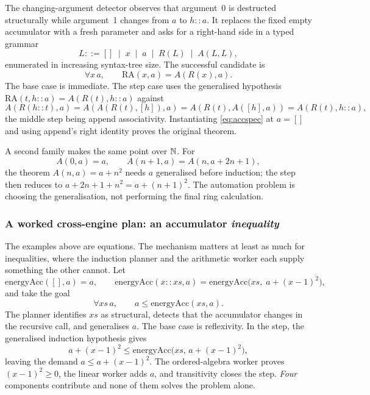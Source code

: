 The changing-argument detector observes that argument~0 is destructed
structurally while argument~1 changes from $a$ to $h::a$. It replaces the fixed
empty accumulator with a fresh parameter and asks for a right-hand side in a
typed grammar
\[
  L ::= []\;\mid\; x\;\mid\; a\;\mid\; R(L)\;\mid\; A(L,L),
\]
enumerated in increasing syntax-tree size. The successful candidate is
\begin{equation}\label{eq:accspec}
\forall x\,a,\qquad \mathrm{RA}(x,a)=A(R(x),a).
\end{equation}
The base case is immediate. The step case uses the generalised hypothesis
$\mathrm{RA}(t,h::a)=A(R(t),h::a)$ against
\[
A(R(h::t),a)=A(A(R(t),[h]),a)=A(R(t),A([h],a))=A(R(t),h::a),
\]
the middle step being append associativity. Instantiating \eqref{eq:accspec} at
$a=[]$ and using append's right identity proves the original theorem.

A second family makes the same point over $\mathbb{N}$. For
\[
 A(0,a)=a,\qquad A(n+1,a)=A(n,a+2n+1),
\]
the theorem $A(n,a)=a+n^2$ needs $a$ generalised before induction; the step then
reduces to $a+2n+1+n^2=a+(n+1)^2$. The automation problem is choosing the
generalisation, not performing the final ring calculation.

\subsubsection*{A worked cross-engine plan: an accumulator \emph{inequality}}

The examples above are equations. The mechanism matters at least as much for
inequalities, where the induction planner and the arithmetic worker each supply
something the other cannot. Let
\[
\mathrm{energyAcc}([],a)=a,\qquad
\mathrm{energyAcc}(x::xs,a)=\mathrm{energyAcc}\bigl(xs,\;a+(x-1)^2\bigr),
\]
and take the goal
\begin{equation}\label{eq:energy}
\forall xs\,a,\qquad a\le\mathrm{energyAcc}(xs,a).
\end{equation}
The planner identifies $xs$ as structural, detects that the accumulator changes
in the recursive call, and generalises $a$. The base case is reflexivity. In the
step, the generalised induction hypothesis gives
\[
 a+(x-1)^2\le\mathrm{energyAcc}\bigl(xs,\,a+(x-1)^2\bigr),
\]
leaving the demand $a\le a+(x-1)^2$. The ordered-algebra worker proves
$(x-1)^2\ge0$, the linear worker adds $a$, and transitivity closes the step.
\emph{Four} components contribute and none of them solves the problem alone.

